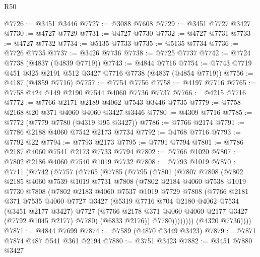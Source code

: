 \begin{lexlean}{R50}
\begin{coremodule}
@7726 := @3451 @3446
@7727 := @3088 @7608
@7729 := @3451 @7727 @3427
@7730 := @4727 @7729
@7731 := @4727 @7730
@7732 := @4727 @7731
@7733 := @4727 @7732
@7734 := @5135 @7733
@7735 := @5135 @7734
@7736 := @7726 @7735
@7737 := @3426 @7736
@7738 := @7725 @7737
@7742 := @7724 @7738 (@4837 (@4839 @7719))
@7743 := @4844 @7716
@7754 := @7743 @7719 @451 @325 @2191 @512 @3427 @7716 @7738 (@4837 (@4854 @7719))
@7756 := @4187 (@4859 @7716)
@7757 := @7754 @7756
@7758 := @4197 @7716
@7765 := @7758 @424 @149 @2190 @7544 @4060 @7736 @7737
@7766 := @4215 @7716
@7772 := @7766 @2171 @2189 @4062 @7543 @3446 @7735
@7779 := @7758 @2168 @20 @371 @4060 @4060 @3427 @3446
@7780 := @4309 @7716
@7785 := @7772 (@7779 @7780 (@4319 @95 @3427))
@7786 := @7766 @2174
@7791 := @7786 @2188 @4060 @7542 @2173 @7734
@7792 := @4768 @7716
@7793 := @7792 @22
@7794 := @7793 @2173
@7795 := @7791 @7794
@7801 := @7786 @2187 @4060 @7541 @2173 @7733 @7794
@7802 := @7766 @1020
@7807 := @7802 @2186 @4060 @7540 @1019 @7732
@7808 := @7793 @1019
@7870 := @7711
    (@7742
      (@7757
        (@7765
          (@7785
            (@7795
              (@7801
                (@7807
                  @7808
                  (@7802
                    @2185
                    @4060
                    @7539
                    @1019
                    @7731
                    @7808
                    (@7802
                      @2184
                      @4060
                      @7538
                      @1019
                      @7730
                      @7808
                      (@7802
                        @2183
                        @4060
                        @7537
                        @1019
                        @7729
                        @7808
                        (@7766
                          @2181
                          @371
                          @7535
                          @4060
                          @7727
                          @3427
                          (@5319
                            @7716
                            @704
                            @2180
                            @4062
                            @7534
                            (@3451 @2177 @3427)
                            @7727
                            (@7766 @2178 @371 @4060 @4060 @2177 @3427 (@7792 @1045 @2177) @7780)
                            (@6833 @2176))
                          @7780))))))))
          (@4320 @7736))))
@7871 := @4844 @7699
@7874 := @7589 (@4870 @3449 @3423)
@7879 := @7871 @7874 @487 @541 @361 @2194
@7880 := @3751 @3423
@7882 := @3451 @7880 @3427

\end{coremodule}
\end{lexlean}
